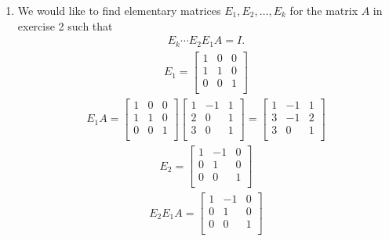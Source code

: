 \documentclass[12pt]{article}
\begin{document}
\begin{enumerate}
  \item
    We would like to find elementary matrices $E_1, E_2, \ldots,
    E_k$ for the matrix $A$ in exercise 2 such that
    \begin{align*}
      E_k \cdots E_2E_1A = I.
    \end{align*}
    \begin{align*}
      E_1 =
      \begin{bmatrix}
        1 &  0 & 0\\
        1 &  1 & 0\\
        0 &  0 & 1\\
      \end{bmatrix}
    \end{align*}
    \begin{align*}
      E_1A =
      \begin{bmatrix}
        1 &  0 & 0\\
        1 &  1 & 0\\
        0 &  0 & 1\\
      \end{bmatrix}
      \begin{bmatrix}
        1 & -1 & 1\\
        2 &  0 & 1\\
        3 &  0 & 1\\
      \end{bmatrix}
      =
      \begin{bmatrix}
        1 & -1 & 1\\
        3 & -1 & 2\\
        3 &  0 & 1\\
      \end{bmatrix}
    \end{align*}
    \begin{align*}
      E_2 =
      \begin{bmatrix}
        1 & -1 & 0\\
        0 &  1 & 0\\
        0 &  0 & 1\\
      \end{bmatrix}
    \end{align*}
    \begin{align*}
      E_2E_1A =
      \begin{bmatrix}
        1 & -1 & 0\\
        0 &  1 & 0\\
        0 &  0 & 1\\
      \end{bmatrix}

\end{align*}
\end{enumerate}
\end{document}
